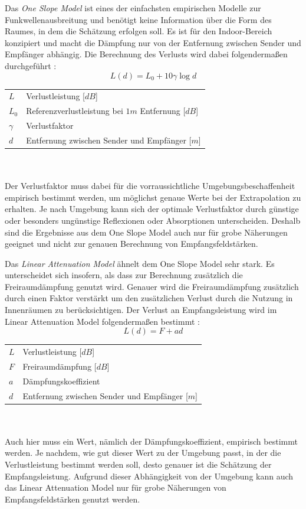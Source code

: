 \documentclass[10pt]{scrartcl}
\begin{document}
Das \textit{One Slope Model} ist eines der einfachsten empirischen Modelle zur Funkwellenausbreitung und benötigt keine Information über die Form des Raumes, in dem die Schätzung erfolgen soll. Es ist für den Indoor-Bereich konzipiert und macht die Dämpfung nur von der Entfernung zwischen Sender und Empfänger abhängig. Die Berechnung des Verlusts wird dabei folgendermaßen durchgeführt \cite[vgl.][S. 33]{markhoja}:
$$
L(d) = L_0 + 10\gamma\log d
$$
\begin{tabular}{ll}
$L$ & Verlustleistung [$dB$]\\
$L_0$ & Referenzverlustleistung bei $1m$ Entfernung [$dB$]\\
$\gamma$ & Verlustfaktor\\
$d$ & Entfernung zwischen Sender und Empfänger [$m$]
\end{tabular}
\\~\\
Der Verlustfaktor muss dabei für die vorraussichtliche Umgebungsbeschaffenheit empirisch bestimmt werden, um möglichst genaue Werte bei der Extrapolation zu erhalten. Je nach Umgebung kann sich der optimale Verlustfaktor durch günstige oder besonders ungünstige Reflexionen oder Absorptionen unterscheiden. Deshalb sind die Ergebnisse aus dem One Slope Model auch nur für grobe Näherungen geeignet und nicht zur genauen Berechnung von Empfangsfeldstärken.

Das \textit{Linear Attenuation Model} ähnelt dem One Slope Model sehr stark. Es unterscheidet sich insofern, als dass zur Berechnung zusätzlich die Freiraumdämpfung genutzt wird. Genauer wird die Freiraumdämpfung zusätzlich durch einen Faktor verstärkt um den zusätzlichen Verlust durch die Nutzung in Innenräumen zu berücksichtigen. Der Verlust an Empfangsleistung wird im Linear Attenuation Model folgendermaßen bestimmt \cite[vgl.][S. 33f]{markhoja}:
\newpage
$$
L(d) = F + ad
$$
\begin{tabular}{ll}
$L$ & Verlustleistung [$dB$]\\
$F$ & Freiraumdämpfung [$dB$]\\
$a$ & Dämpfungskoeffizient\\
$d$ & Entfernung zwischen Sender und Empfänger [$m$]
\end{tabular}
\\~\\
Auch hier muss ein Wert, nämlich der Dämpfungskoeffizient, empirisch bestimmt werden. Je nachdem, wie gut dieser Wert zu der Umgebung passt, in der die Verlustleistung bestimmt werden soll, desto genauer ist die Schätzung der Empfangsleistung. Aufgrund dieser Abhängigkeit von der Umgebung kann auch das Linear Attenuation Model nur für grobe Näherungen von Empfangsfeldstärken genutzt werden.
\end{document}
